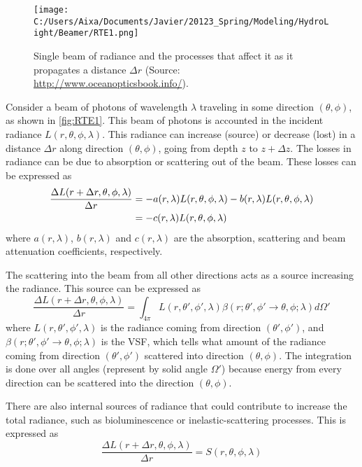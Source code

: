 \begin{figure}[htb]
\centering
      \texttt{[image: C:/Users/Aixa/Documents/Javier/20123\_Spring/Modeling/HydroLight/Beamer/RTE1.png]}
      \caption{Single beam of radiance and the processes that affect it as it propagates a distance $\Delta r$ (Source: \protect\url{http://www.oceanopticsbook.info/}).}
      \label{fig:RTE1}
\end{figure}

Consider a beam of photons of wavelength $\lambda$ traveling in some direction $(\theta,\phi)$, as shown in \autoref{fig:RTE1}. This beam of photons is accounted in the incident radiance $L(r,\theta,\phi,\lambda)$. This radiance can increase (source) or decrease (lost) in a distance $\Delta r$ along direction  $(\theta,\phi)$, going from depth $z$ to $z+\Delta z$. The losses in radiance can be due to absorption or scattering out of the beam. These losses can be expressed as
\begin{align}\label{eq:RTE1}
  \frac{\Delta L(r+\Delta r,\theta,\phi,\lambda)}{\Delta r}&= -a(r,\lambda)L(r,\theta,\phi,\lambda)-b(r,\lambda)L(r,\theta,\phi,\lambda)\notag\\ 
  &= -c(r,\lambda)L(r,\theta,\phi,\lambda) 
\end{align}
where $a(r,\lambda)$, $b(r,\lambda)$ and $c(r,\lambda)$ are the absorption, scattering and beam attenuation coefficients, respectively. 

The scattering into the beam from all other directions acts as a source increasing the radiance. This source can be expressed as
\begin{equation}\label{eq:RTE2}
\frac{\Delta L(r+\Delta r,\theta,\phi,\lambda)}{\Delta r} = \int_{4\pi} L(r,\theta',\phi',\lambda)\beta(r;\theta',\phi' \to \theta,\phi;\lambda)d\Omega'
\end{equation}
where $L(r,\theta',\phi',\lambda)$ is the radiance coming from direction $(\theta',\phi')$, and $\beta(r;\theta',\phi' \to \theta,\phi;\lambda)$ is the VSF, which tells what amount of the radiance coming from direction $(\theta',\phi')$ scattered into direction $(\theta,\phi)$. The integration is done over all angles (represent by solid angle $\Omega'$) because energy from every direction can be scattered into the direction $(\theta,\phi)$.

There are also internal sources of radiance that could contribute to increase the total radiance, such as bioluminescence or inelastic-scattering processes. This is expressed as
\begin{equation}\label{eq:RTE3}
    \frac{\Delta L(r+\Delta r,\theta,\phi,\lambda)}{\Delta r} = S(r,\theta,\phi,\lambda)
\end{equation}

